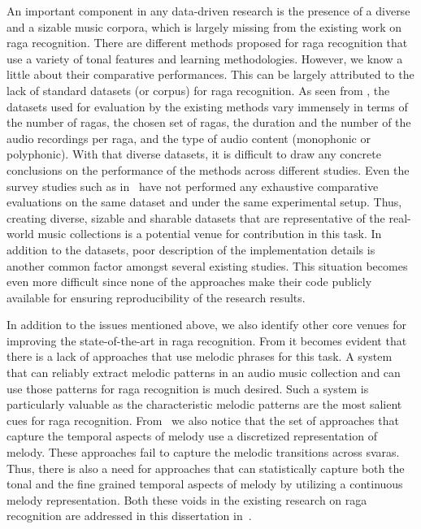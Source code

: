 An important component in any data-driven research is the presence of a diverse and a sizable music corpora, which is largely missing from the existing work on \gls{raga} recognition. There are different methods proposed for \gls{raga} recognition that use a variety of tonal features and learning methodologies. However, we know a little about their comparative performances. This can be largely attributed to the lack of standard datasets (or corpus) for \gls{raga} recognition. As seen from , the datasets used for evaluation by the existing methods vary immensely in terms of the number of \glspl{raga}, the chosen set of \glspl{raga}, the duration and the number of the audio recordings per \gls{raga}, and the type of audio content (monophonic or polyphonic). With that diverse datasets, it is difficult to draw any concrete conclusions on the performance of the methods across different studies. Even the survey studies such as in~\citep{koduri2011survey} have not performed any exhaustive comparative evaluations on the same dataset and under the same experimental setup. Thus, creating diverse, sizable and sharable datasets that are representative of the real-world music collections is a potential venue for contribution in this task. In addition to the datasets, poor description of the implementation details is another common factor amongst several existing studies. This situation becomes even more difficult since none of the approaches make their code publicly available for ensuring reproducibility of the research results. 


In addition to the issues mentioned above, we also identify other core venues for improving the state-of-the-art in \gls{raga} recognition. From  it becomes evident that there is a lack of approaches that use melodic phrases for this task. A system that can reliably extract melodic patterns in an audio music collection and can use those patterns for \gls{raga} recognition is much desired. Such a system is particularly valuable as the characteristic melodic patterns are the most salient cues for \gls{raga} recognition. From~ we also notice that the set of approaches that capture the temporal aspects of melody use a discretized representation of melody. These approaches fail to capture the melodic transitions across \glspl{svara}. Thus, there is also a need for approaches that can statistically capture both the tonal and the fine grained temporal aspects of melody by utilizing a continuous melody representation. Both these voids in the existing research on \gls{raga} recognition are addressed in this dissertation in~.


